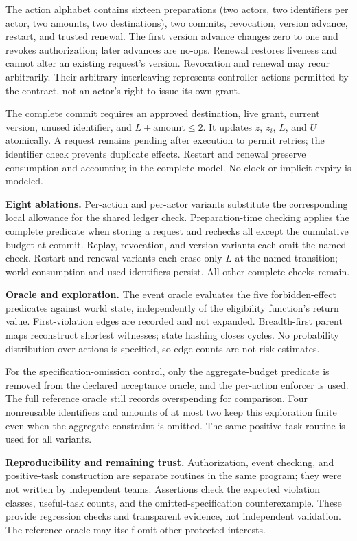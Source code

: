 \documentclass[10pt,twocolumn,letterpaper]{article}
\newcommand{\para}[1]{\smallskip\noindent\textbf{#1}\enspace}
\begin{document}
The action alphabet contains sixteen preparations (two actors, two identifiers per actor, two amounts, two destinations), two commits, revocation, version advance, restart, and trusted renewal. The first version advance changes zero to one and revokes authorization; later advances are no-ops. Renewal restores liveness and cannot alter an existing request's version. Revocation and renewal may recur arbitrarily. Their arbitrary interleaving represents controller actions permitted by the contract, not an actor's right to issue its own grant.

The complete commit requires an approved destination, live grant, current version, unused identifier, and $L+\text{amount}\le2$. It updates $z$, $z_i$, $L$, and $U$ atomically. A request remains pending after execution to permit retries; the identifier check prevents duplicate effects. Restart and renewal preserve consumption and accounting in the complete model. No clock or implicit expiry is modeled.

\para{Eight ablations.} Per-action and per-actor variants substitute the corresponding local allowance for the shared ledger check. Preparation-time checking applies the complete predicate when storing a request and rechecks all except the cumulative budget at commit. Replay, revocation, and version variants each omit the named check. Restart and renewal variants each erase only $L$ at the named transition; world consumption and used identifiers persist. All other complete checks remain.

\para{Oracle and exploration.} The event oracle evaluates the five forbidden-effect predicates against world state, independently of the eligibility function's return value. First-violation edges are recorded and not expanded. Breadth-first parent maps reconstruct shortest witnesses; state hashing closes cycles. No probability distribution over actions is specified, so edge counts are not risk estimates.

For the specification-omission control, only the aggregate-budget predicate is removed from the declared acceptance oracle, and the per-action enforcer is used. The full reference oracle still records overspending for comparison. Four nonreusable identifiers and amounts of at most two keep this exploration finite even when the aggregate constraint is omitted. The same positive-task routine is used for all variants.

\para{Reproducibility and remaining trust.} Authorization, event checking, and positive-task construction are separate routines in the same program; they were not written by independent teams. Assertions check the expected violation classes, useful-task counts, and the omitted-specification counterexample. These provide regression checks and transparent evidence, not independent validation. The reference oracle may itself omit other protected interests.
\end{document}
